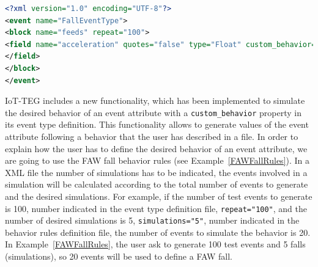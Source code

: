 \documentclass[10pt,journal,compsoc]{IEEEtran}
\begin{document}
\begin{lstlisting}[basicstyle=\ttfamily\footnotesize,language=XML,caption={Fall event type definition},label=FallEvent, breaklines=true]
<?xml version="1.0" encoding="UTF-8"?>
<event name="FallEventType">
<block name="feeds" repeat="100">
<field name="acceleration" quotes="false" type="Float" custom_behavior="/Path/To/Rule/File">
</field>
</block>
</event>
\end{lstlisting}

IoT-TEG includes a new functionality, which has been implemented to simulate the desired behavior of an event attribute with a \texttt{custom\_behavior} property in its event type definition. This functionality allows to generate values of the event attribute following a behavior that the user has described in a file.
In order to explain how the user has to define the desired behavior of an event attribute, we are going to use the FAW fall behavior rules (see Example~\ref{FAWFallRules}). In a XML file the number of simulations has to be
indicated, the events involved in a simulation will be calculated according to the total number of events to generate and the desired simulations. For example, if the number of test events to generate is 100, number indicated in the event type definition file, \texttt{repeat="100"}, and the number of desired 
simulations is 5, \texttt{simulations="5"}, number indicated in the behavior rules definition file, the number of events to simulate the behavior is 20. In Example~\ref{FAWFallRules}, the user ask to generate 100 test events and 5 falls (simulations), so 20 events will be used to define a FAW fall.
\end{document}
